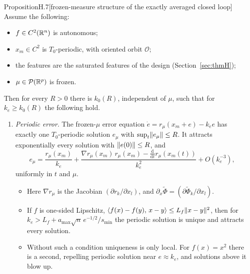 \begin{thm}{Proposition}{H.7}[frozen-measure structure of the exactly averaged closed loop]
Assume the following:
\begin{itemize}
  \item $f\in C^2(\mathbb{R}^n)$ is autonomous;
  \item $x_m\in C^2$ is $T_0$-periodic, with oriented orbit $\mathcal{O}$;
  \item the features are the saturated features of the design (Section~\ref{sec:thmH});
  \item $\mu\in\mathcal{P}(\mathbb{R}^p)$ is frozen.
\end{itemize}
Then for every $R>0$ there is $k_0(R)$, independent of $\mu$, such that for $k_e\ge k_0(R)$ the following hold.
\begin{enumerate}[label=(\alph*)]
  \item \emph{Periodic error.} The frozen-$\mu$ error equation $\dot e = r_\mu(x_m+e) - k_e e$ has exactly one
    $T_0$-periodic solution $e_\mu$ with $\sup_t\lVert e_\mu\rVert\le R$. It attracts exponentially every solution with
    $\lVert e(0)\rVert\le R$, and
    \begin{equation}\label{eq:finitegain:emu}
      e_\mu = \frac{r_\mu(x_m)}{k_e}
        + \frac{\nabla r_\mu(x_m)\, r_\mu(x_m) - \frac{\mathrm{d}}{\mathrm{d}t} r_\mu(x_m(t))}{k_e^2}
        + O(k_e^{-3}),
    \end{equation}
    uniformly in $t$ and $\mu$.
    \begin{itemize}
      \item Here $\nabla r_\mu$ is the Jacobian $(\partial r_k/\partial x_l)$, and
        $\partial_x\tilde\Phi = (\partial\tilde\Phi_k/\partial x_l)$.
      \item If $f$ is one-sided Lipschitz, $\langle f(x)-f(y),\, x-y\rangle\le L_f\lVert x-y\rVert^2$, then for
        $k_e > L_f + a_{\max}\sqrt{n}\,e^{-1/2}/s_{\min}$ the periodic solution is unique and attracts every
        solution.
      \item Without such a condition uniqueness is only local. For $f(x)=x^2$ there is a second, repelling periodic
        solution near $e\approx k_e$, and solutions above it blow up.
    \end{itemize}


\end{enumerate}
\end{thm}
